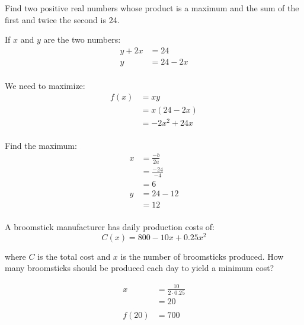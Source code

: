 \documentclass{exam}
\begin{document}
  \begin{questions}
    \question Find two positive real numbers whose product is a maximum and the sum of the first and twice the second 
      is 24.

      \begin{solution}
        If $x$ and $y$ are the two numbers:
        \begin{align*}
          y + 2x &= 24 \\
          y      &= 24 - 2x \\
        \end{align*}

        We need to maximize:
        \begin{align*}
          f(x) &= xy \\
          &= x(24 - 2x) \\
          &= -2x^2 + 24x \\
        \end{align*}

        Find the maximum:
        \begin{align*}
          x  &= \frac{-b}{2a} \\
             &= \frac{-24}{-4} \\
             &= 6
          \\
          y  &= 24 - 12 \\
             &= 12 \\
        \end{align*}


      \end{solution}

    \question
      A broomstick manufacturer has daily production costs of:
      \[
        C(x) = 800 - 10x + 0.25x^2
      \]

      where $C$ is the total cost and $x$ is the number of broomsticks produced.  How many broomsticks should be
      produced each day to yield a minimum cost?

      \begin{solution}
        \begin{align*}
          x     &= \frac{10}{2 \cdot 0.25} \\
                &= 20 \\
          \\
          f(20) &= 700 \\
        \end{align*}


\end{solution}
\end{questions}
\end{document}
